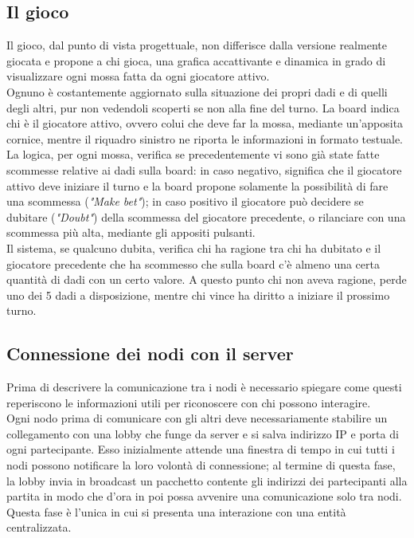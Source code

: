 \documentclass{llncs}
\begin{document}
	\subsection{Il gioco}
	Il gioco, dal punto di vista progettuale, non differisce dalla versione realmente giocata e propone a chi gioca, una grafica accattivante e dinamica in grado di visualizzare ogni mossa fatta da ogni giocatore attivo.\\
	Ognuno è costantemente aggiornato sulla situazione dei propri dadi e di quelli degli altri, pur non vedendoli scoperti se non alla fine del turno. La board indica chi è il giocatore attivo, ovvero colui che deve far la mossa, mediante un'apposita cornice, mentre il riquadro sinistro ne riporta le informazioni in formato testuale.\\
	La logica, per ogni mossa, verifica se precedentemente vi sono già state fatte scommesse relative ai dadi sulla board: in caso negativo, significa che il giocatore attivo deve iniziare il turno e la board propone solamente la possibilità di fare una scommessa (\textit{"Make bet"}); in caso positivo il giocatore può decidere se dubitare (\textit{"Doubt"}) della scommessa del giocatore precedente, o rilanciare con una scommessa più alta, mediante gli appositi pulsanti.\\
	Il sistema, se qualcuno dubita, verifica chi ha ragione tra chi ha dubitato e il giocatore precedente che ha scommesso che sulla board c'è almeno una certa quantità di dadi con un certo valore. A questo punto chi non aveva ragione, perde uno dei 5 dadi a disposizione, mentre chi vince ha diritto a iniziare il prossimo turno.\\

	\subsection{Connessione dei nodi con il server}
	Prima di descrivere la comunicazione tra i nodi è necessario spiegare come questi reperiscono le informazioni utili per riconoscere con chi possono interagire. \\
	Ogni nodo prima di comunicare con gli altri deve necessariamente stabilire un collegamento con una lobby che funge da server e si salva indirizzo IP e porta di ogni partecipante. Esso inizialmente attende una finestra di tempo in cui tutti i nodi possono notificare la loro volontà di connessione; al termine di questa fase, la lobby invia in broadcast un pacchetto contente gli indirizzi dei partecipanti alla partita in modo che d'ora in poi possa avvenire una comunicazione solo tra nodi. Questa fase è l'unica in cui si presenta una interazione con una entità centralizzata. 
\end{document}
